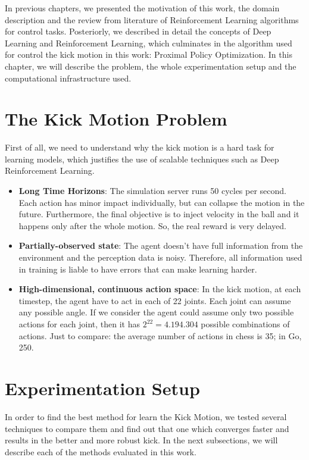 In previous chapters, we presented the motivation of this work, the domain description and the review from literature of Reinforcement Learning algorithms for control tasks. Posteriorly, we described in detail the concepts of Deep Learning and Reinforcement Learning, which culminates in the algorithm used for control the kick motion in this work: Proximal Policy Optimization. In this chapter, we will describe the problem, the whole experimentation setup and the computational infrastructure used.

\section{The Kick Motion Problem}

First of all, we need to understand why the kick motion is a hard task for learning models, which justifies the use of scalable techniques such as Deep Reinforcement Learning.

\begin{itemize}
	\item \textbf{Long Time Horizons}: The simulation server runs 50 cycles per second. Each action has minor impact individually, but can collapse the motion in the future. Furthermore, the final objective is to inject velocity in the ball and it happens only after the whole motion. So, the real reward is very delayed.
	
	\item \textbf{Partially-observed state}: The agent doesn't have full information from the environment and the perception data is noisy. Therefore, all information used in training is liable to have errors that can make learning harder.
	
	\item \textbf{High-dimensional, continuous action space}: In the kick motion, at each timestep, the agent have to act in each of 22 joints. Each joint can assume any possible angle. If we consider the agent could assume only two possible actions for each joint, then it has $2^{22} = 4.194.304$ possible combinations of actions. Just to compare: the average number of actions in chess is 35; in Go, 250.
\end{itemize}
\section{Experimentation Setup}\label{sec:experimentation_setup}
In order to find the best method for learn the Kick Motion, we tested several techniques to compare them and find out that one which converges faster and results in the better and more robust kick. In the next subsections, we will describe each of the methods evaluated in this work.

